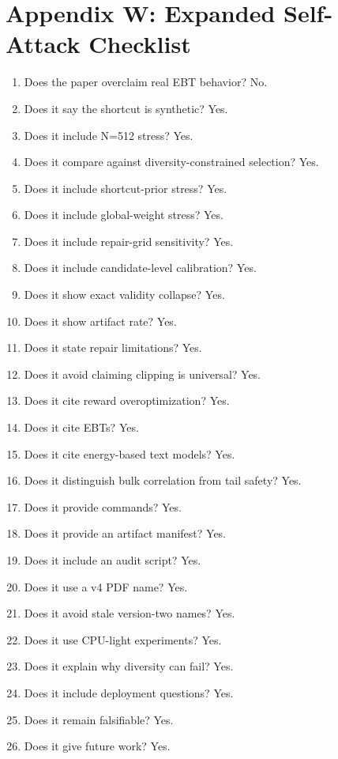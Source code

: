 \documentclass{article}
\begin{document}
\section{Appendix W: Expanded Self-Attack Checklist}

\begin{enumerate}
  \item Does the paper overclaim real EBT behavior? No.
  \item Does it say the shortcut is synthetic? Yes.
  \item Does it include N=512 stress? Yes.
  \item Does it compare against diversity-constrained selection? Yes.
  \item Does it include shortcut-prior stress? Yes.
  \item Does it include global-weight stress? Yes.
  \item Does it include repair-grid sensitivity? Yes.
  \item Does it include candidate-level calibration? Yes.
  \item Does it show exact validity collapse? Yes.
  \item Does it show artifact rate? Yes.
  \item Does it state repair limitations? Yes.
  \item Does it avoid claiming clipping is universal? Yes.
  \item Does it cite reward overoptimization? Yes.
  \item Does it cite EBTs? Yes.
  \item Does it cite energy-based text models? Yes.
  \item Does it distinguish bulk correlation from tail safety? Yes.
  \item Does it provide commands? Yes.
  \item Does it provide an artifact manifest? Yes.
  \item Does it include an audit script? Yes.
  \item Does it use a v4 PDF name? Yes.
  \item Does it avoid stale version-two names? Yes.
  \item Does it use CPU-light experiments? Yes.
  \item Does it explain why diversity can fail? Yes.
  \item Does it include deployment questions? Yes.
  \item Does it remain falsifiable? Yes.
  \item Does it give future work? Yes.

\end{enumerate}
\end{document}

